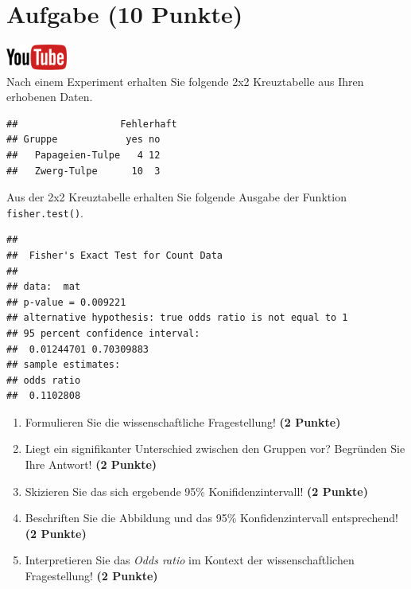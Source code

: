 \documentclass[a4paper, 9pt]{scrartcl}\usepackage[]{graphicx}\usepackage[]{xcolor}
\makeatletter
\newenvironment{kframe}{%
 \def\at@end@of@kframe{}%
 \ifinner\ifhmode%
  \def\at@end@of@kframe{\end{minipage}}%
  \begin{minipage}{\columnwidth}%
 \fi\fi%
 \def\FrameCommand##1{\hskip\@totalleftmargin \hskip-\fboxsep
 \colorbox{shadecolor}{##1}\hskip-\fboxsep
     \hskip-\linewidth \hskip-\@totalleftmargin \hskip\columnwidth}%
 \MakeFramed {\advance\hsize-\width
   \@totalleftmargin\z@ \linewidth\hsize
   \@setminipage}}%
 {\par\unskip\endMakeFramed%
 \at@end@of@kframe}
\newenvironment{knitrout}{}{} %
\makeatother
\begin{document}
\section{Aufgabe \hfill (10 Punkte)}

\hfill\href{https://youtu.be/ghArbetOr_E}{\includegraphics[width =
  2cm]{img/youtube}}\\[1Ex]

Nach einem Experiment erhalten Sie folgende 2x2 Kreuztabelle aus Ihren
erhobenen Daten.

\begin{knitrout}
\color{fgcolor}\begin{kframe}
\begin{verbatim}
##                  Fehlerhaft
## Gruppe            yes no
##   Papageien-Tulpe   4 12
##   Zwerg-Tulpe      10  3
\end{verbatim}
\end{kframe}
\end{knitrout}

Aus der 2x2 Kreuztabelle erhalten Sie folgende \Rlogo Ausgabe der Funktion
\texttt{fisher.test()}.

\begin{knitrout}
\color{fgcolor}\begin{kframe}
\begin{verbatim}
## 
## 	Fisher's Exact Test for Count Data
## 
## data:  mat
## p-value = 0.009221
## alternative hypothesis: true odds ratio is not equal to 1
## 95 percent confidence interval:
##  0.01244701 0.70309883
## sample estimates:
## odds ratio 
##  0.1102808
\end{verbatim}
\end{kframe}
\end{knitrout}


\begin{enumerate}
\item Formulieren Sie die wissenschaftliche Fragestellung! \textbf{(2 Punkte)}
\item Liegt ein signifikanter Unterschied zwischen den Gruppen vor?
  Begr{\"u}nden Sie Ihre Antwort! \textbf{(2 Punkte)}
\item Skizieren Sie das sich ergebende 95\% Konifidenzintervall! \textbf{(2 Punkte)}
\item Beschriften Sie die Abbildung und
  das 95\% Konfidenzintervall entsprechend! \textbf{(2 Punkte)} 
\item Interpretieren Sie das \textit{Odds ratio} im Kontext der
  wissenschaftlichen Fragestellung! \textbf{(2 Punkte)} 
\end{enumerate}
 
\end{document}
